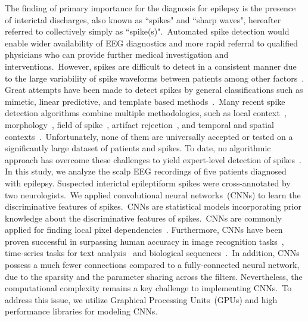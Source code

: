 \documentclass{article}
\begin{document}
The finding of primary importance for the diagnosis for epilepsy is the presence of interictal discharges, also known as ``spikes" and ``sharp waves", hereafter referred to collectively simply as ``spike(s)".~Automated spike detection would enable wider availability of EEG diagnostics and more rapid referral to qualified physicians who can provide further medical
investigation and interventions.~However, spikes are difficult to detect in a consistent manner due to the large variability of spike waveforms between patients among other factors~\cite{jin2014spikegui}.
Great attempts have been made to detect spikes by general classifications such as mimetic, linear predictive, and template based methods~\cite{wilson2002spike}.~Many recent spike detection algorithms combine multiple methodologies, such as local context~\cite{gotman1992state,guedes1983spike,wilson1999spike},
morphology~\cite{gotman1991state,guedes1983spike,wilson1999spike,faure1985attributed,davey1989expert,webber1994practical},
field of spike~\cite{gotman1991state,wilson1999spike,gabor1992automated,webber1994practical,ramabhadran1999automated},
artifact rejection~\cite{gotman1991state,guedes1983spike,wilson1999spike}, and temporal and spatial contexts~\cite{gotman1991state,ramabhadran1999automated,black2000real}.~Unfortunately, none of them are universally accepted or tested on a significantly large dataset of patients and spikes. To date, no algorithmic approach has overcome these challenges to yield expert-level detection of spikes~\cite{jin2014spikegui}.\\

In this study, we analyze the scalp EEG recordings of five patients diagnosed with epilepsy. Suspected interictal epileptiform spikes were cross-annotated by two neurologists.~We applied convolutional neural networks~(CNNs) to learn the discriminative features of spikes.~CNNs are statistical models incorporating prior knowledge about the discriminative features of spikes.~CNNs are commonly applied for finding local pixel dependencies~\cite{NIPS2012_4824}.
Furthermore, CNNs have been proven successful in surpassing human accuracy in image recognition tasks~\cite{DBLP:journals/corr/HeZR015}, time-series tasks for text analysis~\cite{DBLP:journals/corr/ZhangL15} and biological sequences~\cite{sonderby2015convolutional}.~In addition, CNNs possess a much fewer connections compared to a fully-connected neural network, due to the sparsity and the parameter sharing across the filters. Nevertheless, the computational complexity remains a key challenge to implementing CNNs.~To address this issue, we utilize Graphical Processing Units~(GPUs) and high performance libraries for modeling CNNs. \\
\end{document}
